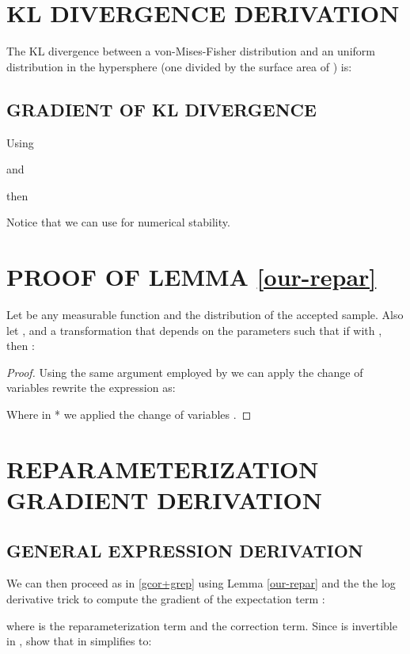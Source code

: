 \documentclass[letterpaper]{article}
\begin{document}
\section{KL DIVERGENCE DERIVATION}\label{ap:kl-divergence}


The KL divergence between a von-Mises-Fisher distribution  and an uniform distribution in the hypersphere (one divided by the surface area of )  is:


\subsection{GRADIENT OF KL DIVERGENCE}
Using

and

then

Notice that we can use  for numerical stability.

\section{PROOF OF LEMMA \ref{our-repar} } \label{app:reparameterization-trick}
\begin{lem}[2]
Let  be any measurable function and  the distribution of the accepted sample. 
Also let , and  a transformation that depends on the parameters such that if  with , then :

\end{lem}
\begin{proof}

    
Using the same argument employed by \citet{rejection-repar} we can apply the change of variables  rewrite the expression as:

Where in * we applied the change of variables .
\end{proof}

\section{REPARAMETERIZATION GRADIENT DERIVATION} \label{ap:gradient-deriv}
\subsection{GENERAL EXPRESSION DERIVATION}
We can then proceed as in \ref{gcor+grep} using Lemma \ref{our-repar} and the the log derivative trick to compute the gradient of the expectation term :

where  is the reparameterization term and  the correction term.
Since  is invertible in , \citet{rejection-repar} show that  in  simplifies to:
\end{document}
